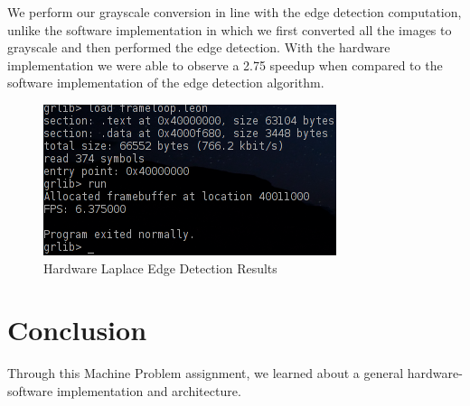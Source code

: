 \documentclass{article}
\begin{document}
We perform our grayscale conversion in line with the edge detection computation, unlike the software implementation in which we first converted all the images to grayscale and then performed the edge detection. With the hardware implementation we were able to observe a 2.75 speedup when compared to the software implementation of the edge detection algorithm.\\

	 \begin{figure}[H]
	 	\begin{center}
	 		\includegraphics[scale=0.6]{../part7_files/Hardware_Laplace_edge_detection_performance.png}
	 		\caption{Hardware Laplace Edge Detection Results}
	 	\end{center}
	 \end{figure}



\section{Conclusion}

Through this Machine Problem assignment, we learned about a general  hardware-software implementation and architecture.


%

%

\end{document}
